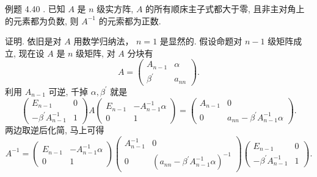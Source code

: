 \documentclass{article}
\begin{document}
{\heiti 例题 4.40 .} {\kaishu 已知 $A$ 是 $n$ 级实方阵, $A$ 的所有顺床主子式都大于零, 且非主对角上的元素都为负数, 则 $A^{-1}$ 的元索都为正数.}

{\heiti 证明.} 依旧是对 $A$ 用数学归纳法， $n=1$ 是显然的. 假设命题对 $n-1$ 级矩阵成立, 现在设 $A$ 是 $n$ 级矩阵, 对 $A$ 分块有
\begin{equation*}
    A=\left(\begin{array}{cc}
        A_{n-1}        & \alpha  \\
        \beta^{\prime} & a_{n n}
    \end{array}\right).
\end{equation*}
利用 $A_{n-1}$ 可逆, 千掉 $\alpha, \beta^{\prime}$ 就是
\begin{equation*}
    \left(\begin{array}{cc}
        E_{n-1}                      & 0 \\
        -\beta^{\prime} A_{n-1}^{-1} & 1
    \end{array}\right) A\left(\begin{array}{cc}
        E_{n-1} & -A_{n-1}^{-1} \alpha \\
        0       & 1
    \end{array}\right)=\left(\begin{array}{cc}
        A_{n-1} & 0                                          \\
        0       & a_{n n}-\beta^{\prime} A_{n-1}^{-1} \alpha
    \end{array}\right).
\end{equation*}
两边取逆后化简, 马上可得
\begin{equation*}
    A^{-1}=\left(\begin{array}{cc}
            E_{n-1} & -A_{n-1}^{-1} \alpha \\
            0       & 1
        \end{array}\right)\left(\begin{array}{cc}
            A_{n-1}^{-1} & 0                                                            \\
            0            & \left(a_{n n}-\beta^{\prime} A_{n-1}^{-1} \alpha\right)^{-1}
        \end{array}\right)\left(\begin{array}{cc}
            E_{n-1}                      & 0 \\
            -\beta^{\prime} A_{n-1}^{-1} & 1
        \end{array}\right).
\end{equation*}
\end{document}
